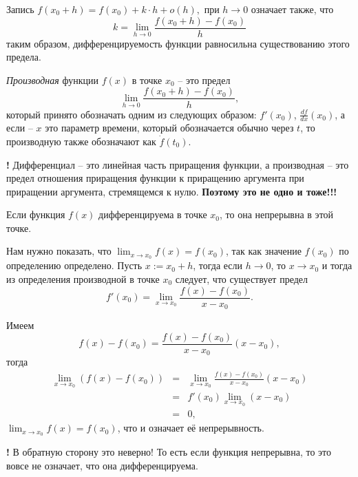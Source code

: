 Запись $f(x_0+h) = f(x_0)+k\cdot h + o(h),$ при $h \to 0$ означает также, что
\[
 k = \lim_{h \to 0} \frac{f(x_0 +h) - f(x_0)}{h}
\]
таким образом, дифференцируемость функции равносильна существованию этого предела.

\begin{definition}\label{derivative_of_function}
    \textit{Производная} функции $f(x)$ в точке $x_0$ -- это предел 
    \[
 \lim_{h\to 0} \frac{f(x_0 + h) - f(x_0)}{h},
    \]
    который принято обозначать одним из следующих образом: $f'(x_0)$, $\frac{d f}{dx}(x_0)$, а если -- $x$ это параметр времени, который обозначается обычно через $t$, то производную также обозначают как $\dot{f}(t_0)$.
\end{definition}

\begin{mydanger}{\bf{!}}
    Дифференциал -- это линейная часть приращения функции, а производная -- это предел отношения приращения функции к приращению аргумента при приращении аргумента, стремящемся к нулю. \textbf{Поэтому это не одно и тоже!!!}
\end{mydanger}


\begin{theorem}\label{diff=contionous_on_R}
    Если функция $f(x)$ дифференцируема в точке $x_0$, то она непрерывна в этой точке.
\end{theorem}

Нам нужно показать, что $\lim_{x \to x_0}f(x) = f(x_0)$, так как значение $f(x_0)$ по определению определено. Пусть $x:=x_0 +h$, тогда если $h \to 0$, то $x \to x_0$ и тогда из определения производной в точке $x_0$ следует, что существует предел
\[
 f'(x_0) = \lim_{x\to x_0} \frac{f(x) - f(x_0)}{x-x_0}.
\]

Имеем
\[
 f(x) - f(x_0) = \frac{f(x) - f(x_0)}{x-x_0}(x-x_0),
\]
тогда
\begin{eqnarray*}
     \lim_{x \to x_0} (f(x) - f(x_0))  &=& \lim_{x \to x_0}\frac{f(x) - f(x_0)}{x-x_0}(x-x_0) \\
     &=& f'(x_0) \lim_{x \to x_0}(x-x_0) \\
     &=& 0,
\end{eqnarray*}
\ie $\lim_{x \to x_0} f(x) = f(x_0)$, что и означает её непрерывность.\\

\begin{mydanger}{\bf{!}}
    В обратную сторону это неверно! То есть если функция непрерывна, то это вовсе не означает, что она дифференцируема.
\end{mydanger}

